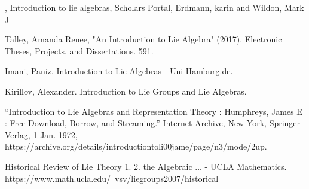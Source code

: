 \documentclass[12pt, letterpaper]{article}
\begin{document}
\newpage

\begin{thebibliography}{book}

, Introduction to lie algebras, Scholars Portal, Erdmann, karin and Wildon, Mark J

\bibitem{}Talley, Amanda Renee, "An Introduction to Lie Algebra" (2017). Electronic Theses, Projects, and
Dissertations. 591. 

Imani, Paniz. Introduction to Lie Algebras - Uni-Hamburg.de. 

 Kirillov, Alexander. Introduction to Lie Groups and Lie Algebras. 

“Introduction to Lie Algebras and Representation Theory : Humphreys, James E : Free Download, Borrow, and Streaming.” Internet Archive, New York, Springer-Verlag, 1 Jan. 1972, https://archive.org/details/introductiontoli00jame/page/n3/mode/2up. 

Historical Review of Lie Theory 1. 2. the Algebraic ... - UCLA Mathematics. https://www.math.ucla.edu/~vsv/liegroups2007/historical%

\end{thebibliography}
\end{document}
